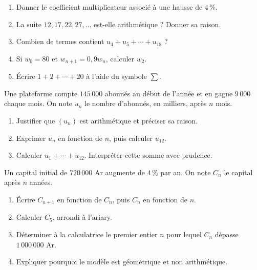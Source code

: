 
\begin{exercice}[1 -- Automatismes]
\begin{enumerate}
\item Donner le coefficient multiplicateur associé à une hausse de $4\,\%$.
\item La suite $12,17,22,27,\ldots$ est-elle arithmétique ? Donner sa raison.
\item Combien de termes contient $u_4+u_5+\cdots+u_{18}$ ?
\item Si $w_0=80$ et $w_{n+1}=0{,}9w_n$, calculer $w_2$.
\item Écrire $1+2+\cdots+20$ à l'aide du symbole $\sum$.
\end{enumerate}
\end{exercice}
\begin{exercice}[2 -- Abonnements]
Une plateforme compte $145\,000$ abonnés au début de l'année et en gagne $9\,000$ chaque mois. On note $u_n$ le nombre d'abonnés, en milliers, après $n$ mois.
\begin{enumerate}
\item Justifier que $(u_n)$ est arithmétique et préciser sa raison.
\item Exprimer $u_n$ en fonction de $n$, puis calculer $u_{12}$.
\item Calculer $u_1+\cdots+u_{12}$. Interpréter cette somme avec prudence.
\end{enumerate}
\end{exercice}
\begin{exercice}
Un capital initial de $720\,000$ Ar augmente de $4\,\%$ par an. On note $C_n$ le capital après $n$ années.
\begin{enumerate}
\item Écrire $C_{n+1}$ en fonction de $C_n$, puis $C_n$ en fonction de $n$.
\item Calculer $C_5$, arrondi à l'ariary.
\item Déterminer à la calculatrice le premier entier $n$ pour lequel $C_n$ dépasse $1\,000\,000$ Ar.
\item Expliquer pourquoi le modèle est géométrique et non arithmétique.
\end{enumerate}
\end{exercice}
